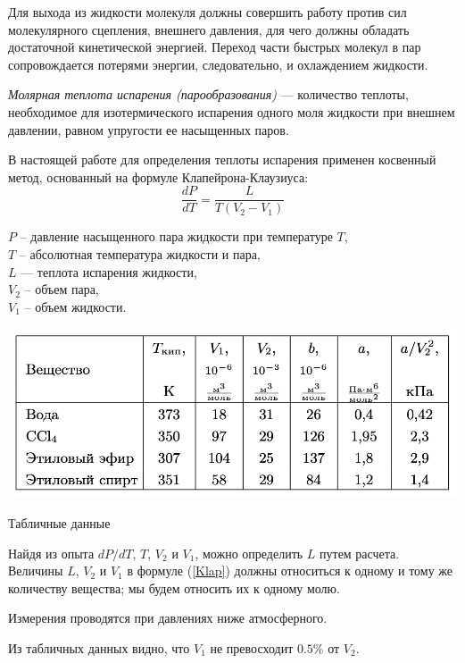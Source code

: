 \documentclass[a4paper,12pt]{article} %
\begin{document}
Для выхода из жидкости молекуля должны совершить работу против сил молекулярного сцепления, внешнего давления, для чего должны обладать достаточной кинетической энергией. Переход части быстрых молекул в пар сопровождается потерями энергии, следовательно, и охлаждением жидкости.

\textit{Молярная теплота испарения (парообразования)} — количество теплоты, необходимое для изотермического испарения одного моля жидкости при внешнем давлении, равном упругости ее насыщенных паров.
    
В настоящей работе для определения теплоты испарения применен косвенный метод, основанный на формуле Клапейрона-Клаузиуса:
\begin{equation}
    \label{Klap}
    \frac{dP}{dT} = \frac{L}{T(V_2 - V_1)}
\end{equation}

\noindent $P$ -- давление насыщенного пара жидкости при температуре $T$,\\ $T$ -- абсолютная температура жидкости и пара,\\ $L$ — теплота испарения жидкости,\\ $V_2$ -- объем пара,\\ $V_1$ -- объем жидкости.

\begin{table}[h]
  \centering
  \includegraphics[scale = 0.55]{table_data.png}
  \caption{Табличные данные}
  \label{fig:table_data}
\end{table}

Найдя из опыта $dP/dT$, $T$, $V_2$ и $V_1$, можно определить $L$ путем расчета. Величины $L$, $V_2$ и $V_1$ в формуле (\ref{Klap}) должны относиться к одному и тому же количеству вещества; мы будем относить их к одному молю.

Измерения проводятся при давлениях ниже атмосферного.

Из табличных данных видно, что $V_1$ не превосходит $0.5\%$ от $V_2$. 

\medskip
\end{document}
